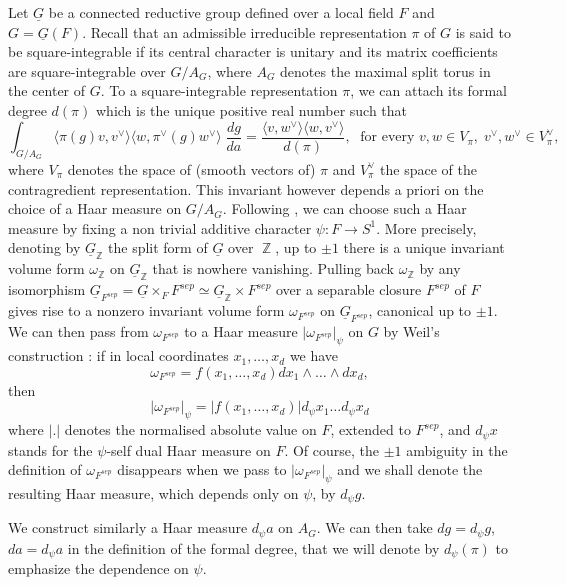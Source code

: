 \documentclass[12pt]{article}
\numberwithin{equation}{section}
\DeclareMathOperator{\bZ}{\mathbb{Z}}
\begin{document}
Let $\underline{G}$ be a connected reductive group defined over a local field $F$ and $G=\underline{G}(F)$. Recall that an admissible irreducible representation $\pi$ of $G$ is said to be square-integrable if its central character is unitary and its matrix coefficients are square-integrable over $G/A_G$, where $A_G$ denotes the maximal split torus in the center of $G$. To a square-integrable representation $\pi$, we can attach its formal degree $d(\pi)$ which is the unique positive real number such that
\begin{equation*}
\displaystyle \int_{G/A_G} \langle \pi(g)v,v^\vee\rangle \langle w,\pi^\vee(g)w^\vee\rangle \; \frac{dg}{da}=\frac{\langle v,w^\vee\rangle \langle w,v^\vee\rangle}{d(\pi)}, \; \mbox{ for every } v,w\in V_\pi,\; v^\vee,w^\vee\in V_\pi^\vee,
\end{equation*}
where $V_\pi$ denotes the space of (smooth vectors of) $\pi$ and $V_\pi^\vee$ the space of the contragredient representation. This invariant however depends a priori on the choice of a Haar measure on $G/A_G$. Following \cite{HII}, we can choose such a Haar measure by fixing a non trivial additive character $\psi: F\to S^1$. More precisely, denoting by $\underline{G}_{\bZ}$ the split form of $\underline{G}$ over $\bZ$, up to $\pm 1$ there is a unique invariant volume form $\omega_{\bZ}$ on $\underline{G}_{\bZ}$ that is nowhere vanishing. Pulling back $\omega_{\bZ}$ by any isomorphism $\underline{G}_{F^{sep}}=\underline{G}\times_F F^{sep}\simeq \underline{G}_{\bZ}\times F^{sep}$ over a separable closure $F^{sep}$ of $F$ gives rise to a nonzero invariant volume form $\omega_{F^{sep}}$ on $\underline{G}_{F^{sep}}$, canonical up to $\pm 1$. We can then pass from $\omega_{F^{sep}}$ to a Haar measure $\lvert\omega_{F^{sep}}\rvert_\psi$ on $G$ by Weil's construction \cite{Weiladeles}: if in local coordinates $x_1,\ldots,x_d$ we have
$$\displaystyle \omega_{F^{sep}}=f(x_1,\ldots,x_d)dx_1\wedge\ldots\wedge dx_d,$$
then
$$\displaystyle \lvert\omega_{F^{sep}}\rvert_\psi=\lvert f(x_1,\ldots,x_d)\rvert d_\psi x_1\ldots d_\psi x_d$$
where $\lvert .\rvert$ denotes the normalised absolute value on $F$, extended to $F^{sep}$, and $d_\psi x$ stands for the $\psi$-self dual Haar measure on $F$. Of course, the $\pm 1$ ambiguity in the definition of $\omega_{F^{sep}}$ disappears when we pass to $\lvert \omega_{F^{sep}}\rvert_\psi$ and we shall denote the resulting Haar measure, which depends only on $\psi$, by $d_\psi g$.

We construct similarly a Haar measure $d_\psi a$ on $A_G$. We can then take $dg=d_\psi g$, $da=d_\psi a$ in the definition of the formal degree, that we will denote by $d_\psi(\pi)$ to emphasize the dependence on $\psi$.
\end{document}
